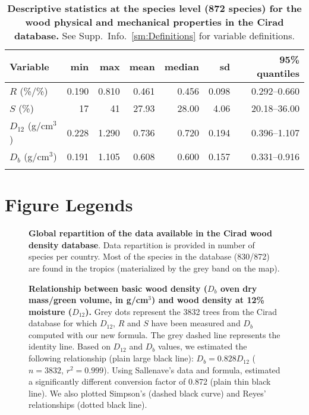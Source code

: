 \documentclass[a4paper, 12pt, leqno, dvipsnames]{article}\usepackage[]{graphicx}\usepackage[]{color}
\begin{document}
\newpage

  \begin{longtable}{@{}lrrrrrr@{}} 
    \caption{\textbf{Descriptive statistics at the species level (872 species) for the
      wood physical and mechanical properties in the Cirad database.}
      See Supp.~Info.~\ref{sm:Definitions} for variable definitions.}\label{tab:Stat}\\
    \toprule
    Variable & min & max & mean & median & sd & 95\% quantiles \\
    \midrule
    $R$ (\%/\%) & 0.190 & 0.810 & 0.461 & 0.456 & 0.098 & 0.292--0.660 \\
    $S$ (\%) & 17 & 41 & 27.93 & 28.00 & 4.06 & 20.18--36.00 \\
    $D_{12}$ (g/cm$^3$) & 0.228 & 1.290 & 0.736 & 0.720 & 0.194 & 0.396--1.107 \\
    $D_b$ (g/cm$^3$) &  0.191 & 1.105 & 0.608 & 0.600 & 0.157 & 0.331--0.916 \\
    \bottomrule\\
  \end{longtable}

\newpage

\section*{Figure Legends}

\begin{figure}[!h] 
\caption{\textbf{Global repartition of the data available in the Cirad wood density database}. Data repartition is provided in number of species per country. Most of the species in the database (830/872) are found in the tropics (materialized by the grey band on the map).}\label{fig:Location}
\end{figure}

\begin{figure}[!h] 
  \caption{\textbf{Relationship between basic wood density ($D_b$ oven dry mass/green volume, in g/cm$^3$) and wood density at 12\% moisture ($D_{12}$).} Grey dots represent the 3832 trees from the Cirad database for which $D_{12}$, $R$ and $S$ have been measured and $D_b$ computed with our new formula. The grey dashed line represents the identity line. Based on $D_{12}$ and $D_b$ values, we estimated the following relationship (plain large black line): $D_b=0.828 D_{12}$ ($n=3832$, $r^2=0.999$). Using Sallenave's data and formula, \citet{Chave2006} estimated a significantly different conversion factor of 0.872 (plain thin black line). We also plotted Simpson's (dashed black curve) and Reyes' relationships (dotted black line).}\label{fig:Db-D12}
  \end{figure}
\end{document}
